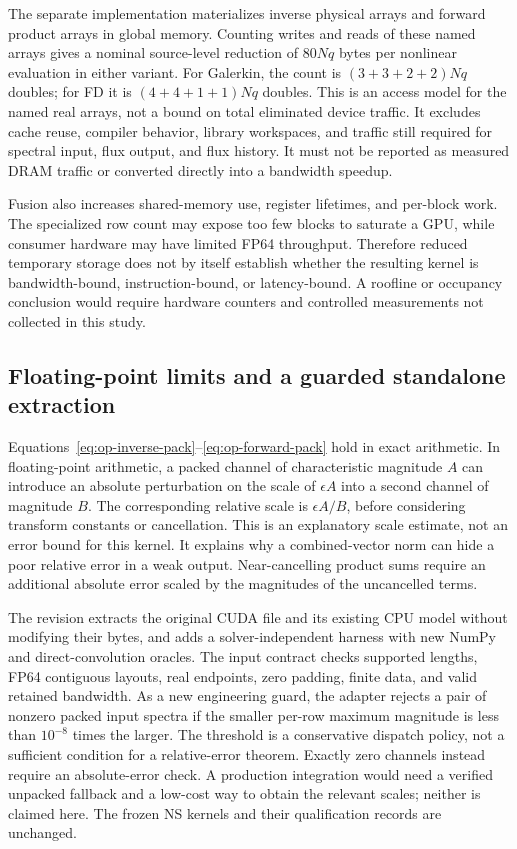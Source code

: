The separate implementation materializes inverse physical arrays and forward product arrays in global memory. Counting writes and reads of these named arrays gives a nominal source-level reduction of \(80Nq\) bytes per nonlinear evaluation in either variant. For Galerkin, the count is \((3+3+2+2)Nq\) doubles; for FD it is \((4+4+1+1)Nq\) doubles. This is an access model for the named real arrays, not a bound on total eliminated device traffic. It excludes cache reuse, compiler behavior, library workspaces, and traffic still required for spectral input, flux output, and flux history. It must not be reported as measured DRAM traffic or converted directly into a bandwidth speedup.

Fusion also increases shared-memory use, register lifetimes, and per-block work. The specialized row count may expose too few blocks to saturate a GPU, while consumer hardware may have limited FP64 throughput. Therefore reduced temporary storage does not by itself establish whether the resulting kernel is bandwidth-bound, instruction-bound, or latency-bound. A roofline or occupancy conclusion would require hardware counters and controlled measurements not collected in this study.

\subsection{Floating-point limits and a guarded standalone extraction}

Equations~\eqref{eq:op-inverse-pack}--\eqref{eq:op-forward-pack} hold in exact arithmetic. In floating-point arithmetic, a packed channel of characteristic magnitude \(A\) can introduce an absolute perturbation on the scale of \(\epsilon A\) into a second channel of magnitude \(B\). The corresponding relative scale is \(\epsilon A/B\), before considering transform constants or cancellation. This is an explanatory scale estimate, not an error bound for this kernel. It explains why a combined-vector norm can hide a poor relative error in a weak output. Near-cancelling product sums require an additional absolute error scaled by the magnitudes of the uncancelled terms.

The revision extracts the original CUDA file and its existing CPU model without modifying their bytes, and adds a solver-independent harness with new NumPy and direct-convolution oracles. The input contract checks supported lengths, FP64 contiguous layouts, real endpoints, zero padding, finite data, and valid retained bandwidth. As a new engineering guard, the adapter rejects a pair of nonzero packed input spectra if the smaller per-row maximum magnitude is less than \(10^{-8}\) times the larger. The threshold is a conservative dispatch policy, not a sufficient condition for a relative-error theorem. Exactly zero channels instead require an absolute-error check. A production integration would need a verified unpacked fallback and a low-cost way to obtain the relevant scales; neither is claimed here. The frozen NS kernels and their qualification records are unchanged.

